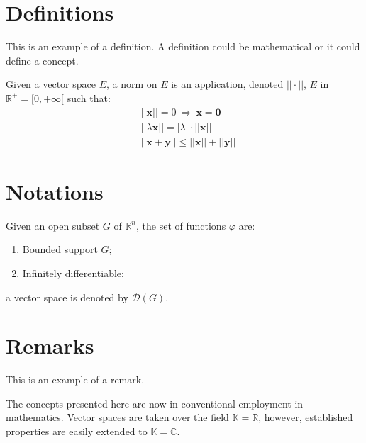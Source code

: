 
\section{Definitions}

This is an example of a definition. A definition could be mathematical or it could define a concept.

\begin{definition}
Given a vector space $E$, a norm on $E$ is an application, denoted $||\cdot||$, $E$ in $\mathbb{R}^+=[0,+\infty[$ such that:
\begin{align}
& ||\mathbf{x}||=0\ \Rightarrow\ \mathbf{x}=\mathbf{0}\\
& ||\lambda \mathbf{x}||=|\lambda|\cdot ||\mathbf{x}||\\
& ||\mathbf{x}+\mathbf{y}||\leq ||\mathbf{x}||+||\mathbf{y}||
\end{align}
\end{definition}


\section{Notations}

\begin{notation}
Given an open subset $G$ of $\mathbb{R}^n$, the set of functions $\varphi$ are:
\begin{enumerate}
\item Bounded support $G$;
\item Infinitely differentiable;
\end{enumerate}
a vector space is denoted by $\mathcal{D}(G)$. 
\end{notation}


\section{Remarks}

This is an example of a remark.

\begin{remark}
The concepts presented here are now in conventional employment in mathematics. Vector spaces are taken over the field $\mathbb{K}=\mathbb{R}$, however, established properties are easily extended to $\mathbb{K}=\mathbb{C}$.
\end{remark}

